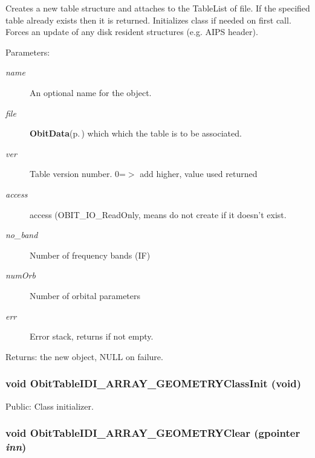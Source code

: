 Creates a new table structure and attaches to the Table\-List of file. If the specified table already exists then it is returned. Initializes class if needed on first call. Forces an update of any disk resident structures (e.g. AIPS header). \begin{Desc}
\item[Parameters:]
\begin{description}
\item[{\em name}]An optional name for the object. \item[{\em file}]{\bf Obit\-Data}{\rm (p.\,\pageref{structObitData})} which which the table is to be associated. \item[{\em ver}]Table version number. 0=$>$ add higher, value used returned \item[{\em access}]access (OBIT\_\-IO\_\-Read\-Only, means do not create if it doesn't exist. \item[{\em no\_\-band}]Number of frequency bands (IF) \item[{\em num\-Orb}]Number of orbital parameters \item[{\em err}]Error stack, returns if not empty. \end{description}
\end{Desc}
\begin{Desc}
\item[Returns:]the new object, NULL on failure. \end{Desc}
\subsubsection{\setlength{\rightskip}{0pt plus 5cm}void Obit\-Table\-IDI\_\-ARRAY\_\-GEOMETRYClass\-Init (void)}\label{ObitTableIDI__ARRAY__GEOMETRY_8c_a27}


Public: Class initializer. 

\subsubsection{\setlength{\rightskip}{0pt plus 5cm}void Obit\-Table\-IDI\_\-ARRAY\_\-GEOMETRYClear (gpointer {\em inn})}\label{ObitTableIDI__ARRAY__GEOMETRY_8c_a9}


